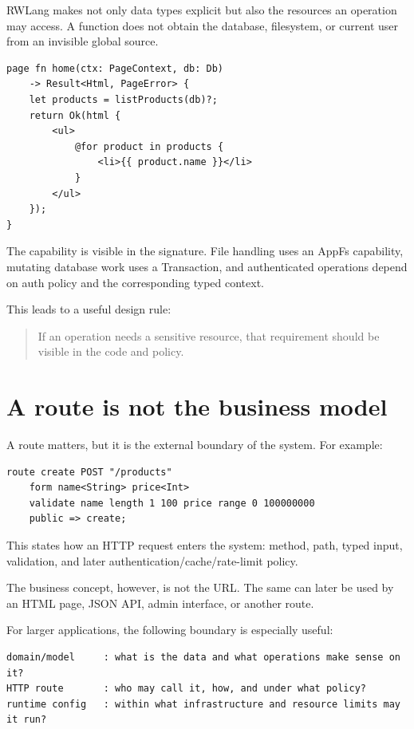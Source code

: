 RWLang makes not only data types explicit but also the resources an operation may access. A function does not obtain the database, filesystem, or current user from an invisible global source.

\begin{lstlisting}[language=RWLang]
page fn home(ctx: PageContext, db: Db)
    -> Result<Html, PageError> {
    let products = listProducts(db)?;
    return Ok(html {
        <ul>
            @for product in products {
                <li>{{ product.name }}</li>
            }
        </ul>
    });
}
\end{lstlisting}

The  capability is visible in the signature. File handling uses an AppFs capability, mutating database work uses a Transaction, and authenticated operations depend on auth policy and the corresponding typed context.

This leads to a useful design rule:

\begin{quote}
If an operation needs a sensitive resource, that requirement should be visible in the code and policy.
\end{quote}

\section{A route is not the business model}

A route matters, but it is the external boundary of the system. For example:

\begin{lstlisting}[language=RWLang]
route create POST "/products"
    form name<String> price<Int>
    validate name length 1 100 price range 0 100000000
    public => create;
\end{lstlisting}

This states how an HTTP request enters the system: method, path, typed input, validation, and later authentication/cache/rate-limit policy.

The business concept, however, is not the  URL. The same  can later be used by an HTML page, JSON API, admin interface, or another route.

For larger applications, the following boundary is especially useful:

\begin{lstlisting}
domain/model     : what is the data and what operations make sense on it?
HTTP route       : who may call it, how, and under what policy?
runtime config   : within what infrastructure and resource limits may it run?
\end{lstlisting}

